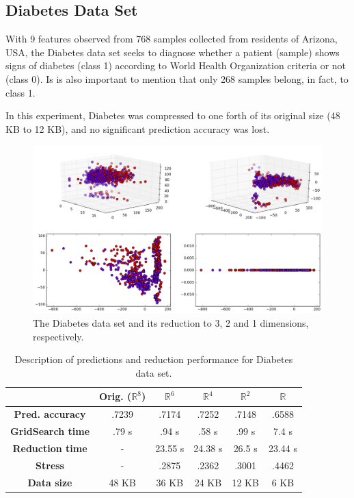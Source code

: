 \newpage
\subsection{Diabetes Data Set}

With 9 features observed from 768 samples collected from residents of Arizona, USA, the Diabetes data set seeks to diagnose whether a patient (sample) shows signs of diabetes (class 1) according to World Health Organization criteria or not (class 0). Is is also important to mention that only 268 samples belong, in fact, to class 1.

In this experiment, Diabetes was compressed to one forth of its original size (48 KB to 12 KB), and no significant prediction accuracy was lost.

\begin{figure}[H]
	\centering
	\includegraphics[width=.85\linewidth]{img/experiments/iso_diabetes}
	\captionsetup{justification=centering}
	\caption{The Diabetes data set and its reduction to 3, 2 and 1 dimensions, respectively.}
	\label{fig:iso_diabetes}
\end{figure}

\begin{table}[H]
	\centering
	\begin{tabular}{|c|c|c|c|c|c|}
		\hline
		& \textbf{Orig. ($\mathbb{R}^{8}$}) & \textbf{$\mathbb{R}^{6}$} & \textbf{$\mathbb{R}^{4}$} & \textbf{$\mathbb{R}^{2}$} & \textbf{$\mathbb{R}$} \\\hline
		\textbf{Pred. accuracy}   & .7239 & .7174 & .7252 & .7148 & .6588 \\\hline
		\textbf{GridSearch time}   & .79 s & .94 s & .58 s & .99 s & 7.4 s \\\hline
		\textbf{Reduction time}    & - & 23.55 s & 24.38 s & 26.5 s & 23.44 s \\\hline
		\textbf{Stress} & - & .2875 & .2362 & .3001 & .4462 \\\hline
		\textbf{Data size}  & 48 KB & 36 KB & 24 KB & 12 KB & 6 KB \\\hline
	\end{tabular}
	\captionsetup{justification=centering}
	\caption{Description of predictions and reduction performance for Diabetes data set.}
\end{table}
